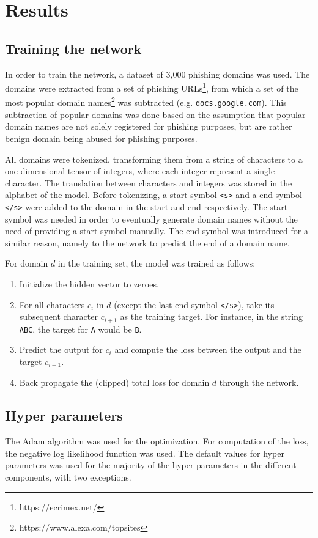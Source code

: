 \section{Results}

\subsection{Training the network}
In order to train the network, a dataset of 3,000 phishing domains was used. 
The domains were extracted from a set of phishing URLs\footnote{https://ecrimex.net/}, from which a set of the most popular domain names\footnote{https://www.alexa.com/topsites} was subtracted (e.g. {\tt docs.google.com}).
This subtraction of popular domains was done based on the assumption that popular domain names are not solely registered for phishing purposes, but are rather benign domain being abused for phishing purposes.

All domains were tokenized, transforming them from a string of characters to a one dimensional tensor of integers, where each integer represent a single character. 
The translation between characters and integers was stored in the alphabet of the model.
Before tokenizing, a start symbol {\tt <s>} and a end symbol {\tt </s>} were added to the domain in the start and end respectively. 
The start symbol was needed in order to eventually generate domain names without the need of providing a start symbol manually.
The end symbol was introduced for a similar reason, namely to the network to predict the end of a domain name.

For domain $d$ in the training set, the model was trained as follows:
\begin{enumerate}
\item Initialize the hidden vector to zeroes.
\item For all characters $c_i$ in $d$ (except the last end symbol {\tt </s>}), take its subsequent character $c_{i+1}$ as the training target.
For instance, in the string {\tt ABC}, the target for {\tt A} would be {\tt B}.
\item Predict the output for $c_i$ and compute the loss between the output and the target $c_{i+1}$.
\item Back propagate the (clipped) total loss for domain $d$ through the network.
\end{enumerate}

\subsection{Hyper parameters}
The Adam algorithm was used for the optimization.
For computation of the loss, the negative log likelihood function was used. 
The default values for hyper parameters was used for the majority of the hyper parameters in the different components, with two exceptions. 

